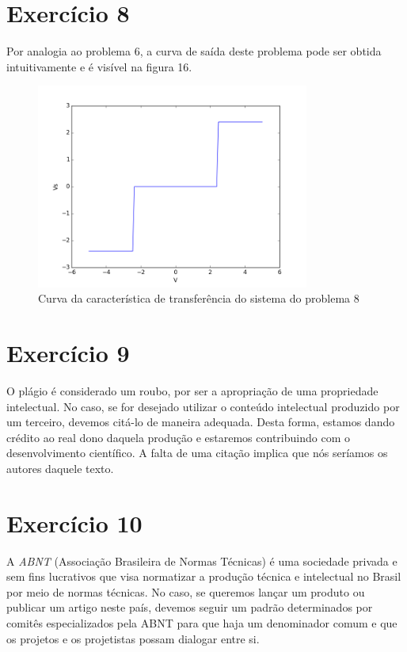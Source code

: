\documentclass[12pt, a4paper, twoside]{article}
\begin{document}
\section{Exercício 8}

Por analogia ao problema 6, a curva de saída deste problema pode ser obtida
intuitivamente e é visível na figura 16.

\begin{figure}[H]
    \centering
    \includegraphics[width=0.8\textwidth]{figs/rel3/ex8.png}
    \caption{Curva da característica de transferência do sistema do problema 8}
\end{figure}

\section{Exercício 9}

O plágio é considerado um roubo, por ser a apropriação de uma propriedade intelectual.
No caso, se for desejado utilizar o conteúdo intelectual produzido por um terceiro,
devemos citá-lo de maneira adequada. Desta forma, estamos dando crédito ao real dono
daquela produção e estaremos contribuindo com o desenvolvimento científico. A falta de
uma citação implica que nós seríamos os autores daquele texto.

\section{Exercício 10}

A \textit{ABNT} (Associação Brasileira de Normas Técnicas) é uma sociedade privada e
sem fins lucrativos que visa normatizar a produção técnica e intelectual no Brasil por
meio de normas técnicas. No caso, se queremos lançar um produto ou publicar um artigo
neste país, devemos seguir um padrão determinados por comitês especializados pela ABNT
para que haja um denominador comum e que os projetos e os projetistas possam dialogar
entre si.
\end{document}
